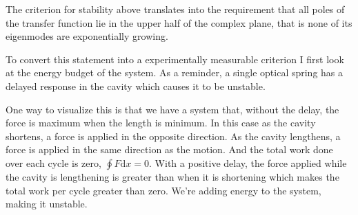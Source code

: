 The criterion for stability above translates into the requirement that all
poles of the transfer function lie in the upper half of the complex plane,
that is none of its eigenmodes are exponentially growing.

To convert this statement into a experimentally measurable criterion I first
look at the energy budget of the system.
As a reminder, a single optical spring has a delayed response in the cavity
which causes it to be unstable.

One way to visualize this is that we have a system that, without the delay,
the force is maximum when the length is minimum.
In this case as the cavity shortens, a force is applied in the opposite
direction.
As the cavity lengthens, a force is applied in the same direction as the motion.
And the total work done over each cycle is zero, $\oint F \mathrm{d}x = 0$.
With a positive delay, the force applied while the cavity is lengthening is
greater than when it is shortening which makes the total work per cycle greater
than zero.
We're adding energy to the system, making it unstable.

